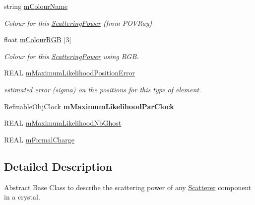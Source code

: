 \begin{DoxyCompactItemize}
\mbox{\label{class_obj_cryst_1_1_scattering_power_a0726f45b1f31f338326a28345b57738e}} 
string \mbox{\hyperlink{class_obj_cryst_1_1_scattering_power_a0726f45b1f31f338326a28345b57738e}{m\+Colour\+Name}}
\begin{DoxyCompactList}\small\item\em Colour for this \mbox{\hyperlink{class_obj_cryst_1_1_scattering_power}{Scattering\+Power}} (from P\+O\+V\+Ray) \end{DoxyCompactList}\item 
\mbox{\label{class_obj_cryst_1_1_scattering_power_a00cf7e1fbe362a96be4a22c8b454fd29}} 
float \mbox{\hyperlink{class_obj_cryst_1_1_scattering_power_a00cf7e1fbe362a96be4a22c8b454fd29}{m\+Colour\+R\+GB}} \mbox{[}3\mbox{]}
\begin{DoxyCompactList}\small\item\em Colour for this \mbox{\hyperlink{class_obj_cryst_1_1_scattering_power}{Scattering\+Power}} using R\+GB. \end{DoxyCompactList}\item 
\mbox{\label{class_obj_cryst_1_1_scattering_power_a20aa001aad26734367838792eff09682}} 
R\+E\+AL \mbox{\hyperlink{class_obj_cryst_1_1_scattering_power_a20aa001aad26734367838792eff09682}{m\+Maximum\+Likelihood\+Position\+Error}}
\begin{DoxyCompactList}\small\item\em estimated error (sigma) on the positions for this type of element. \end{DoxyCompactList}\item 
\mbox{\label{class_obj_cryst_1_1_scattering_power_a727c82cdb03968dba28c5f7549860093}} 
Refinable\+Obj\+Clock {\bfseries m\+Maximum\+Likelihood\+Par\+Clock}
\item 
R\+E\+AL \mbox{\hyperlink{class_obj_cryst_1_1_scattering_power_a53eeb0a26003df0bcf604817e2fbadf7}{m\+Maximum\+Likelihood\+Nb\+Ghost}}
\item 
R\+E\+AL \mbox{\hyperlink{class_obj_cryst_1_1_scattering_power_a030be52e5ba5540bf068e6be4ccb190e}{m\+Formal\+Charge}}
\end{DoxyCompactItemize}


\subsection{Detailed Description}
Abstract Base Class to describe the scattering power of any \mbox{\hyperlink{class_obj_cryst_1_1_scatterer}{Scatterer}} component in a crystal. 

